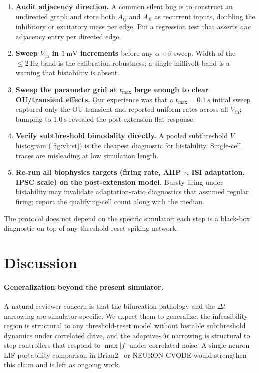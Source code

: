 \documentclass[11pt]{article}
\newcommand{\dt}{\Delta t}
\newcommand{\Vth}{V_{\text{th}}}
\begin{document}
\begin{enumerate}
  \item \textbf{Audit adjacency direction.} A common silent bug is to
        construct an undirected graph and store both $A_{ij}$ and
        $A_{ji}$ as recurrent inputs, doubling the inhibitory or
        excitatory mass per edge. Pin a regression test that asserts
        \emph{one} adjacency entry per directed edge.
  \item \textbf{Sweep $\Vth$ in $\SI{1}{\milli\volt}$ increments}
        before any $\alpha\times\beta$ sweep. Width of the
        $\le\!\SI{2}{\hertz}$ band is the calibration robustness; a
        single-millivolt band is a warning that bistability is
        absent.
  \item \textbf{Sweep the parameter grid at $t_{\text{max}}$ large
        enough to clear OU/transient effects.} Our experience was
        that a $t_{\text{max}}=\SI{0.1}{\second}$ initial sweep
        captured only the OU transient and reported uniform rates
        across all $\Vth$; bumping to $\SI{1.0}{\second}$ revealed
        the post-extension flat response.
  \item \textbf{Verify subthreshold bimodality directly.} A pooled
        subthreshold $V$ histogram (\cref{fig:vhist}) is the cheapest
        diagnostic for bistability. Single-cell traces are
        misleading at low simulation length.
  \item \textbf{Re-run all biophysics targets (firing rate, AHP $\tau$,
        ISI adaptation, IPSC scale) on the post-extension model.}
        Bursty firing under bistability may invalidate
        adaptation-ratio diagnostics that assumed regular firing;
        report the qualifying-cell count along with the median.
\end{enumerate}

The protocol does not depend on the specific simulator; each step is
a black-box diagnostic on top of any threshold-reset spiking network.

\section{Discussion}
\label{sec:discussion}

\paragraph{Generalization beyond the present simulator.} A natural
reviewer concern is that the bifurcation pathology and the $\dt$
narrowing are simulator-specific. We expect them to generalize: the
infeasibility region is structural to any threshold-reset model
without bistable subthreshold dynamics under correlated drive, and
the adaptive-$\dt$ narrowing is structural to step controllers that
respond to $\max|f|$ under correlated noise. A single-neuron LIF
portability comparison in Brian2~\cite{brian2} or NEURON CVODE would
strengthen this claim and is left as ongoing work.
\end{document}
